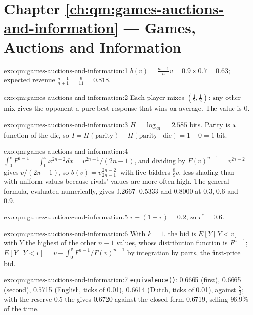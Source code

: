 \section*{Chapter \ref{ch:qm:games-auctions-and-information} --- Games, Auctions and Information}

\begin{solution}{exo:qm:games-auctions-and-information:1}
$b(v) = \frac{n-1}nv = 0.9 \times 0.7 = 0.63$; expected revenue $\frac{n-1}{n+1} = \frac9{11} = 0.818$.
\end{solution}

\begin{solution}{exo:qm:games-auctions-and-information:2}
Each player mixes $(\frac12, \frac12)$: any other mix gives the opponent a pure best response that wins on average. The value is 0.
\end{solution}

\begin{solution}{exo:qm:games-auctions-and-information:3}
$H = \log_26 = 2.585$ bits. Parity is a function of the die, so $I = H(\text{parity}) - H(\text{parity} \mid \text{die}) = 1 - 0 = 1$ bit.
\end{solution}

\begin{solution}{exo:qm:games-auctions-and-information:4}
$\int_0^vF^{n-1} = \int_0^vx^{2n-2}dx = v^{2n-1}/(2n-1)$, and dividing by $F(v)^{n-1} = v^{2n-2}$ gives $v/(2n-1)$, so $b(v) = v\frac{2n-2}{2n-1}$: with five bidders $\frac89v$, less shading than with uniform values
because rivals' values are more often high. The general formula, evaluated numerically, gives 0.2667, 0.5333 and 0.8000 at 0.3, 0.6 and 0.9.
\end{solution}

\begin{solution}{exo:qm:games-auctions-and-information:5}
$r - (1 - r) = 0.2$, so $r^* = 0.6$.
\end{solution}

\begin{solution}{exo:qm:games-auctions-and-information:6}
With $k = 1$, the bid is $E[Y \mid Y < v]$ with $Y$ the highest of the other $n - 1$ values, whose distribution function is $F^{n-1}$; $E[Y \mid Y < v] = v - \int_0^vF^{n-1}/F(v)^{n-1}$ by integration by parts, the
first-price bid.
\end{solution}

\begin{solution}{exo:qm:games-auctions-and-information:7}
\texttt{equivalence()}: 0.6665 (first), 0.6665 (second), 0.6715 (English, ticks of 0.01), 0.6614 (Dutch, ticks of 0.01), against $\frac23$; with the reserve 0.5 the  gives 0.6720 against the closed
form 0.6719, selling 96.9\% of the time.
\end{solution}

